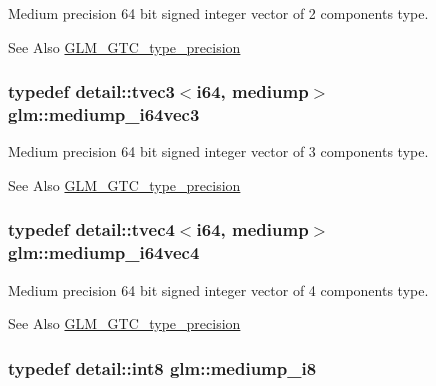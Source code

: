 Medium precision 64 bit signed integer vector of 2 components type. \begin{DoxySeeAlso}{See Also}
\hyperlink{group__gtc__type__precision}{G\-L\-M\-\_\-\-G\-T\-C\-\_\-type\-\_\-precision} 
\end{DoxySeeAlso}
\hypertarget{group__gtc__type__precision_gae1aa82d2b9a62a87648306205dfe69ab}{
\subsubsection[{mediump\-\_\-i64vec3}]{\setlength{\rightskip}{0pt plus 5cm}typedef detail\-::tvec3$<$i64, mediump$>$ {\bf glm\-::mediump\-\_\-i64vec3}}}\label{group__gtc__type__precision_gae1aa82d2b9a62a87648306205dfe69ab}
Medium precision 64 bit signed integer vector of 3 components type. \begin{DoxySeeAlso}{See Also}
\hyperlink{group__gtc__type__precision}{G\-L\-M\-\_\-\-G\-T\-C\-\_\-type\-\_\-precision} 
\end{DoxySeeAlso}
\hypertarget{group__gtc__type__precision_gab4db11ebb425fa18fe5d15d455c360a3}{
\subsubsection[{mediump\-\_\-i64vec4}]{\setlength{\rightskip}{0pt plus 5cm}typedef detail\-::tvec4$<$i64, mediump$>$ {\bf glm\-::mediump\-\_\-i64vec4}}}\label{group__gtc__type__precision_gab4db11ebb425fa18fe5d15d455c360a3}
Medium precision 64 bit signed integer vector of 4 components type. \begin{DoxySeeAlso}{See Also}
\hyperlink{group__gtc__type__precision}{G\-L\-M\-\_\-\-G\-T\-C\-\_\-type\-\_\-precision} 
\end{DoxySeeAlso}
\hypertarget{group__gtc__type__precision_ga28a8b5fd51072680bb55178c17cc7411}{
\subsubsection[{mediump\-\_\-i8}]{\setlength{\rightskip}{0pt plus 5cm}typedef detail\-::int8 {\bf glm\-::mediump\-\_\-i8}}}\label{group__gtc__type__precision_ga28a8b5fd51072680bb55178c17cc7411}
